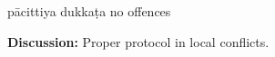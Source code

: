 \begin{exam}{\autoExamName}
\begin{problem}
    \bigskip

    \begin{answers}{3}
      \bChoices
       pācittiya\eAns
       dukkaṭa\eAns
       no offences\eAns
      \eChoices
    \end{answers}

    \bigskip

    \textbf{Discussion:} Proper protocol in local conflicts.

  \end{problem}

\end{exam}
